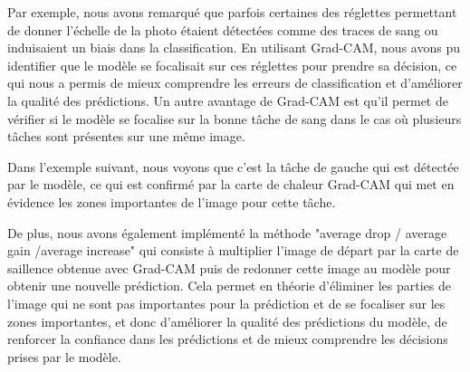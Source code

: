 Par exemple, nous avons remarqué que parfois certaines des réglettes permettant de donner l'échelle de la photo étaient détectées comme des traces de sang ou induisaient un biais dans la classification.
En utilisant Grad-CAM, nous avons pu identifier que le modèle se focalisait sur ces réglettes pour prendre sa décision, ce qui nous a permis de mieux comprendre
les erreurs de classification et d'améliorer la qualité des prédictions.
Un autre avantage de Grad-CAM est qu'il permet de vérifier si le modèle se focalise sur la bonne tâche de sang
dans le cas où plusieurs tâches sont présentes sur une même image.

Dans l'exemple suivant, nous voyons que c'est la tâche de gauche qui est détectée par le modèle, ce qui est confirmé par la carte de chaleur Grad-CAM qui met en évidence les zones importantes de l'image pour cette tâche.


De plus, nous avons également implémenté la méthode "average drop / average gain /average increase" qui consiste à multiplier l'image de départ par la carte de saillence obtenue avec Grad-CAM puis de redonner cette image au modèle
pour obtenir une nouvelle prédiction.
Cela permet en théorie d'éliminer les parties de l'image qui ne sont pas importantes pour la prédiction et de se focaliser sur les zones importantes, et 
donc d'améliorer la qualité des prédictions du modèle, de renforcer la confiance dans les prédictions et de mieux comprendre les décisions prises par le modèle.



